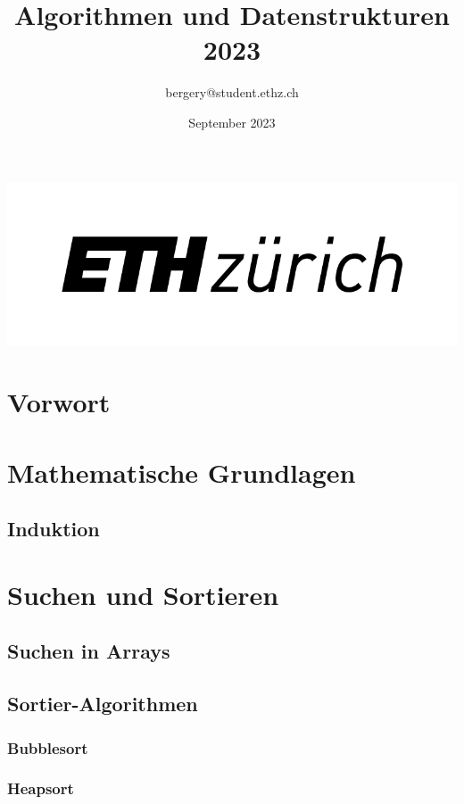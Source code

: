 \documentclass[a4paper]{article}
\title{Algorithmen und Datenstrukturen 2023}
\author{bergery@student.ethz.ch}
\date{September 2023}
\begin{document}
\maketitle
\begin{center}
    \includegraphics{Pictures/eth_logo_kurz_pos Kopie.png}
\end{center}

\tableofcontents
\newpage

\section{Vorwort}
\section{Mathematische Grundlagen}
    \subsection{Induktion}
\section{Suchen und Sortieren}

\subsection{Suchen in Arrays}

\subsection{Sortier-Algorithmen}

    \subsubsection{Bubblesort}\label{alg:Bubblesort}


    \subsubsection{Heapsort}\label{alg:Heapsort}
\end{document}
